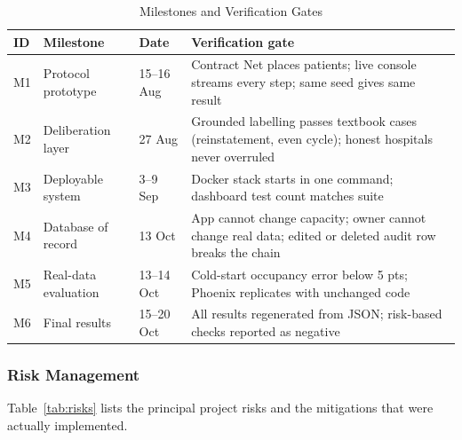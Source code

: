 \begin{table}[!t]
\centering
\caption{Milestones and Verification Gates}
\label{tab:milestones}
\scriptsize
\setlength{\tabcolsep}{2.5pt}
\begin{tabular}{@{}p{0.45cm}p{1.9cm}p{0.95cm}p{4.0cm}@{}}
\toprule
ID & Milestone & Date & Verification gate \\
\midrule
M1 & Protocol prototype & 15--16 Aug & Contract Net places patients; live console streams every step; same seed gives same result \\
M2 & Deliberation layer & 27 Aug & Grounded labelling passes textbook cases (reinstatement, even cycle); honest hospitals never overruled \\
M3 & Deployable system & 3--9 Sep & Docker stack starts in one command; dashboard test count matches suite \\
M4 & Database of record & 13 Oct & App cannot change capacity; owner cannot change real data; edited or deleted audit row breaks the chain \\
M5 & Real-data evaluation & 13--14 Oct & Cold-start occupancy error below 5 pts; Phoenix replicates with unchanged code \\
M6 & Final results & 15--20 Oct & All results regenerated from JSON; risk-based checks reported as negative \\
\bottomrule
\end{tabular}
\end{table}

\subsubsection{Risk Management}
Table~\ref{tab:risks} lists the principal project risks and the mitigations that were actually implemented.


